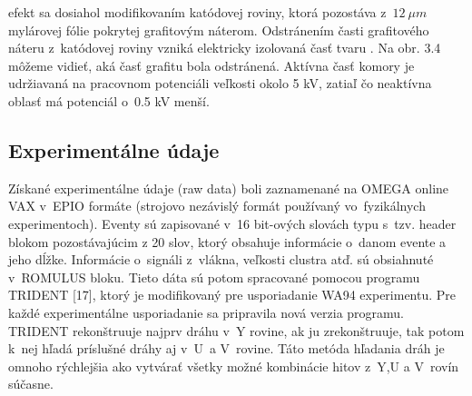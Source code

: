  efekt sa dosiahol modifikovaním katódovej roviny, ktorá
pozostá\-va z~$12\: \mu m$ mylárovej fólie pokrytej grafitovým náterom.
Odstránením časti grafitového náteru z~katódovej roviny vzniká elektricky
izolovaná časť tvaru . Na obr. 3.4 môžeme vidieť, aká časť
grafitu bola odstránená. Aktívna časť komory je udržiavaná na pracovnom
potenciáli veľkosti okolo 5 kV, zatiaľ čo neaktívna oblasť má potenciál
o~0.5 kV menší.

\newpage
\subsection{Experimentálne údaje}
Získané experimentálne údaje (raw data)  boli zaznamenané na
OMEGA online VAX  v~EPIO formáte (strojovo nezávislý formát používaný
vo~fyzikálnych experimentoch). Eventy sú zapisované v~16 bit-ových slovách
typu  s~tzv. header blokom pozostávajúcim z  20
slov, ktorý obsahuje informácie o~danom evente a jeho dĺžke. Informácie
o~signáli z~vlákna, veľkosti clustra atď. sú obsiahnuté v~ROMULUS bloku.
Tieto dáta sú potom spracované pomocou programu TRIDENT  [17], ktorý je
modifikovaný pre usporiadanie WA94 experimentu. Pre každé experimentálne
usporiadanie sa pripravila nová verzia programu. TRIDENT rekonštruuje najprv
dráhu v~Y rovine, ak ju zrekonštruuje, tak potom k~nej hľadá príslušné
dráhy aj v~U~a V~rovine. Táto metóda hľadania dráh je omnoho rýchlejšia ako
vytvárať všetky možné kombinácie hitov z~Y,U a V~rovín súčasne.
